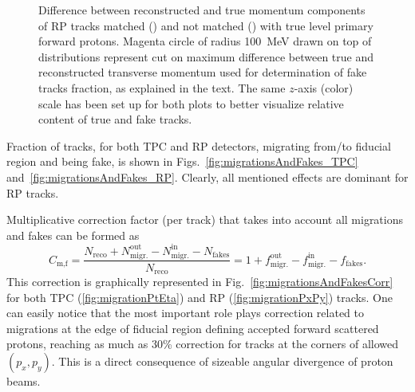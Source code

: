 \begin{figure}
{}%
\caption[Difference between reconstructed and true momentum components of RP tracks.]{Difference between reconstructed and true momentum components of RP tracks matched () and not matched () with true level primary forward protons. Magenta circle of radius 100~MeV drawn on top of distributions represent cut on maximum difference between true and reconstructed transverse momentum used for determination of fake tracks fraction, as explained in the text. The same $z$-axis (color) scale has been set up for both plots to better visualize relative content of true and fake tracks.} \label{fig:DeltaPyVsDeltaPx}
\end{figure}


Fraction of tracks, for both TPC and RP detectors, migrating from/to fiducial region and being fake, is shown in Figs.~\ref{fig:migrationsAndFakes_TPC} and~\ref{fig:migrationsAndFakes_RP}. Clearly, all mentioned effects are dominant for RP tracks.



Multiplicative correction factor (per track) that takes into account all migrations and fakes can be formed as
\begin{equation}
 C_{\text{m,f}} = \frac{N_{\textrm{reco}} + N_{\textrm{migr.}}^{\textrm{out}} - N_{\textrm{migr.}}^{\textrm{in}} - N_{\textrm{fakes}}}{N_{\textrm{reco}}} = 1 + f_{\text{migr.}}^{\text{out}} - f_{\text{migr.}}^{\text{in}} - f_{\text{fakes}}.
\end{equation}
This correction is graphically represented in Fig.~\ref{fig:migrationsAndFakesCorr} for both TPC (\ref{fig:migrationPtEta}) and RP (\ref{fig:migrationPxPy}) tracks. One can easily notice that the most important role plays correction related to migrations at the edge of fiducial region defining accepted forward scattered protons, reaching as much as 30\% correction for tracks at the corners of allowed $(p_{x}, p_{y})$. This is a direct consequence of sizeable angular divergence of proton beams.



